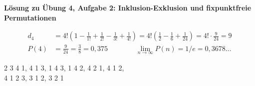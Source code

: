 \textbf{Lösung zu Übung 4, Aufgabe 2: Inklusion-Exklusion und fixpunktfreie Permutationen}

\begin{loesung}
\begin{align*}
d_4 &= 4!\left(1 - \frac{1}{1!} + \frac{1}{2!} - \frac{1}{3!} + \frac{1}{4!}\right) = 4!\left(\frac{1}{2} - \frac{1}{6} + \frac{1}{24}\right) = 4! \cdot \frac{9}{24} = 9\\
P(4) &= \frac{9}{24} = \frac{3}{8} = 0{,}375 \qquad\qquad \lim_{n \to \infty} P(n) = 1/e = 0{,}3678\ldots
\end{align*}

2 3 4 1,  4 1 3,  1 4 3,  1 4 2,  4 2 1,  4 1 2,\\
4 1 2 3,  3 1 2,  3 2 1
\end{loesung}
